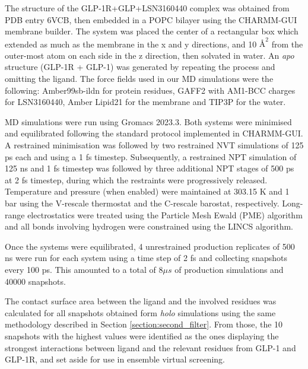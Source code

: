 The structure of the GLP-1R+GLP+LSN3160440 complex was obtained from PDB entry 6VCB\cite{Bueno2020StructuralReceptor}, then embedded in a POPC bilayer using the CHARMM-GUI membrane builder\cite{Lee2016CHARMM-GUIField,Feng2023CHARMM-GUIApplications}. The system was placed the center of a rectangular box which extended as much as the membrane in the x and y directions, and 10 $\text{\AA}^{2}$ from the outer-most atom on each side in the z direction, then solvated in water. An \textit{apo} structure (GLP-1R + GLP-1) was generated by repeating the process and omitting the ligand. The force fields used in our MD simulations were the following: Amber99sb-ildn\cite{Lindorff-Larsen2010ImprovedField} for protein residues, GAFF2\cite{Wang2004DevelopmentField,TheFields} with AM1-BCC charges\cite{Jakalian2002FastValidation} for LSN3160440, Amber Lipid21\cite{Dickson2022Lipid21:AMBER} for the membrane and TIP3P\cite{Mark2001StructureK} for the water.

MD simulations were run using Gromacs 2023.3\cite{Abraham2015GROMACS:Supercomputers}. Both systems were minimised and equilibrated following the standard protocol implemented in CHARMM-GUI. A restrained minimisation was followed by two restrained NVT simulations of 125 ps each and using a 1 fs timestep. Subsequently, a restrained NPT simulation of 125 ns and 1 fs timestep was followed by three additional NPT stages of 500 ps at 2 fs timestep, during which the restraints were progressively released. Temperature and pressure (when enabled) were maintained at 303.15 K and 1 bar using the V-rescale thermostat\cite{Bussi2007CanonicalRescaling} and the C-rescale barostat\cite{Bernetti2020PressureRescaling}, respectively. Long-range electrostatics were treated using the Particle Mesh Ewald (PME) algorithm\cite{Darden1993ParticleSystems} and all bonds involving hydrogen were constrained using the LINCS algorithm\cite{Hess1998LINCS:Simulations}.

Once the systems were equilibrated, 4 unrestrained production replicates of 500 ns were run for each system using a time step of 2 fs and collecting snapshots every 100 ps. This amounted to a total of 8$\mu s$ of production simulations and 40000 snapshots.

The contact surface area between the ligand and the involved residues was calculated for all snapshots obtained form \textit{holo} simulations using the same methodology described in Section \ref{section:second_filter}. From those, the 10 snapshots with the highest values were identified as the ones displaying the strongest interactions between ligand and the relevant residues from GLP-1 and GLP-1R, and set aside for use in ensemble virtual screening.


